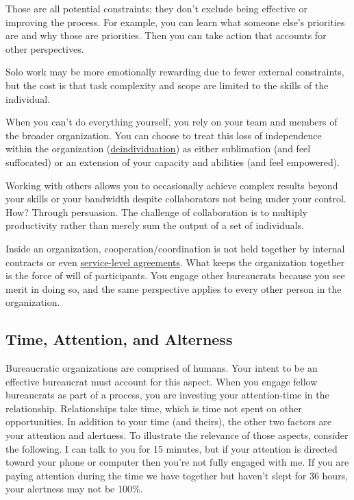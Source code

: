 Those are all potential constraints; they don't exclude being effective or improving the process. 
For example, you can learn what someone else's priorities are and why those are priorities. Then you can take action that accounts for other perspectives.

Solo work may be more emotionally rewarding due to fewer external constraints, but the cost is that task complexity and scope are limited to the skills of the individual. 


When you can't do everything yourself, you rely on your team and members of the broader organization. You can choose to treat this loss of independence within the organization (\href{https://en.wikipedia.org/wiki/Deindividuation}{deindividuation}) 
\iftoggle{WPinmargin}{\marginpar{$>$Wikipedia: deindividuation}}{}
as either sublimation (and feel suffocated) or an extension of your capacity and abilities (and feel empowered).

Working with others allows you to occasionally achieve complex results beyond your skills or your bandwidth despite  collaborators not being under your control. How? Through persuasion. 
The challenge of collaboration is to multiply productivity rather than merely sum the output of a set of individuals. 

Inside an organization, cooperation/coordination is not held together by internal contracts or even \href{https://en.wikipedia.org/wiki/Service-level_agreement}{service-level agreements}. 
%
\iftoggle{WPinmargin}{\marginpar{$>$Wikipedia: Service-level agreements}}{}
What keeps the organization together is the force of will of participants. 
You engage other bureaucrats because you see merit in doing so, and the same perspective applies to every other person in the organization.

\subsection*{Time, Attention, and Alterness}

Bureaucratic organizations are comprised of humans. Your intent to be an effective bureaucrat must account for this aspect.
When you engage fellow bureaucrats as part of a process, you are investing your \gls{attention-time} in the relationship. Relationships take time, which is time not spent on other opportunities. In addition to your time (and theirs), the other two factors are your attention and alertness. To illustrate the relevance of those aspects, consider the following. I can talk to you for 15 minutes, but if your attention is directed toward your phone or computer then you're not fully engaged with me. If you are paying attention during the time we have together but haven't slept for 36 hours, your alertness may not be 100\%. 

